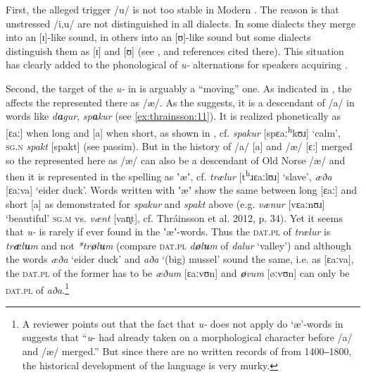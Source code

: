 \documentclass[output=paper,
modfonts
]{LSP/langsci}
\begin{document}
\begin{exe}
First, the alleged trigger /u/ is not too stable in Modern . The
reason is that unstressed /i,u/ are not distinguished in all 
dialects. In some dialects they merge into an {[}ɪ{]}-like sound, in
others into an {[}ʊ{]}-like sound but some dialects distinguish them as
{[}ɪ{]} and {[}ʊ{]} (see \citealt[27]{thrainsson2012}, and references
cited there). This situation has clearly added to the phonological
 of \emph{u-} alternations for speakers acquiring .

Second, the target of the \emph{u-} in  is arguably a
``moving'' one. As indicated in , the  affects the 
represented there as /æ/. As the  suggests, it is a
descendant of  /a/ in words like \emph{d\textbf{a}gur},
\emph{sp\textbf{a}kur} (see \ref{ex:thrainsson:11}). It is realized phonetically as
{[}ɛaː{]} when long and {[}a{]} when short, as shown in , cf.
\emph{spakur} {[}spɛaː\textsuperscript{h}kʊɹ{]} `calm', \textsc{sg.n}
\emph{spakt} {[}spakt{]} (see \citealt[34]{thrainsson2012} passim). But
in the history of   /a/ {[}a{]} and /æ/ {[}ɛː{]} merged
so the  represented here as /æ/ can also be a descendant of Old
Norse /æ/ and then it is represented in the spelling as ʽæʼ, cf.
\emph{trælur} {[}t\textsuperscript{h}ɹɛaːlʊɹ{]} `slave', \emph{æða}
{[}ɛaːva{]} `eider duck'. Words written with ʽæʼ show the same
 between long {[}ɛaː{]} and short {[}a{]} as demonstrated for
\emph{spakur} and \emph{spakt} above (e.g. \emph{vænur} {[}vɛaːnʊɹ{]}
`beautiful' \textsc{sg.m} vs. \emph{vænt} {[}van̥t{]}, cf. Thráinsson et
al. 2012, p. 34). Yet it seems that \emph{u-} is rarely if ever
found in the ʽæʼ-words. Thus the \textsc{dat.pl} of \emph{trælur} is
\emph{tr\textbf{æ}l\textbf{u}m} and not \emph{*tr\textbf{ø}l\textbf{u}m}
(compare \textsc{dat.pl} \emph{d\textbf{ø}l\textbf{u}m} of \emph{dalur}
`valley') and although the words \emph{æða} `eider duck' and \emph{aða}
`(big) mussel' sound the same, i.e. as {[}ɛaːva{]}, the \textsc{dat.pl}
of the former has to be \emph{æðum} {[}ɛaːvʊn{]} and
\emph{\textbf{ø}vum} {[}øːvʊn{]} can only be \textsc{dat.pl} of
\emph{aða}.\footnote{A reviewer points out that the fact that
  \emph{u-} does not apply do `æ'-words in  suggests that
  ``\emph{u}- had already taken on a morphological character
  before /a/ and /æ/ merged.'' But since there are no written records of
   from 1400‒1800, the historical development of the language is
  very murky.}


\end{exe}
\end{document}
